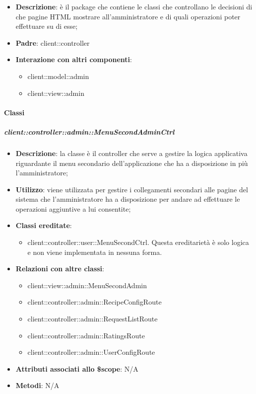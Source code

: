 \begin{itemize}
	\item \textbf{Descrizione}: è il package che contiene le classi che controllano le decisioni di che pagine HTML mostrare all'amministratore e di quali operazioni poter effettuare su di esse;
	\item \textbf{Padre}: client::controller
	\item \textbf{Interazione con altri componenti}:
		\begin{itemize}
			\item client::model::admin
			\item client::view::admin
		\end{itemize}
\end{itemize}

	\paragraph{Classi} %
		\subparagraph{client::controller::admin::MenuSecondAdminCtrl} %
		\label{subp:bdsm_app_client_controller_admin_menusecondadminctrl}

			\begin{itemize}
				\item \textbf{Descrizione}: la classe è il controller che serve a gestire la logica applicativa riguardante il menu secondario dell'applicazione che ha a disposizione in più l'amministratore;
				\item \textbf{Utilizzo}: viene utilizzata per gestire i collegamenti secondari alle pagine del sistema che l'amministratore ha a disposizione per andare ad effettuare le operazioni aggiuntive a lui consentite;
				\item \textbf{Classi ereditate}:
					\begin{itemize}
						\item client::controller::user::MenuSecondCtrl. Questa ereditarietà è solo logica e non viene implementata in nessuna forma.
					\end{itemize}
				\item \textbf{Relazioni con altre classi}:
					\begin{itemize}
						\item client::view::admin::MenuSecondAdmin
						\item client::controller::admin::RecipeConfigRoute
						\item client::controller::admin::RequestListRoute
						\item client::controller::admin::RatingsRoute
						\item client::controller::admin::UserConfigRoute
					\end{itemize}
				\item \textbf{Attributi associati allo \$scope}: N/A
				\item \textbf{Metodi}: N/A
			\end{itemize}

